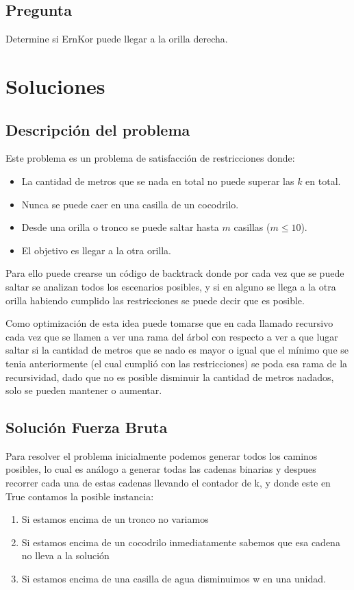\documentclass{article}
\begin{document}
\subsection{Pregunta}
Determine si ErnKor puede llegar a la orilla derecha.

\pagebreak%

\section{Soluciones}

\subsection{Descripción del problema}

Este problema es un problema de satisfacción de restricciones donde:
\begin{itemize}
    \item La cantidad de metros que se nada en total no puede superar las $k$ en total.
    \item Nunca se puede caer en una casilla de un cocodrilo.
    \item Desde una orilla o tronco se puede saltar hasta $m$ casillas ($m \leq 10$).
    \item El objetivo es llegar a la otra orilla.
\end{itemize}

Para ello puede crearse un código de backtrack donde por cada vez que se puede saltar se analizan todos los escenarios posibles, y si en alguno se llega a la otra orilla habiendo cumplido las restricciones se puede decir que es posible.

Como optimización de esta idea puede tomarse que en cada llamado recursivo cada vez que se llamen a ver una rama del árbol con respecto a ver a que lugar saltar si la cantidad de metros que se nado es mayor o igual que el mínimo que se tenia anteriormente (el cual cumplió con las restricciones) se poda esa rama de la recursividad, dado que no es posible disminuir la cantidad de metros nadados, solo se pueden mantener o aumentar.

\subsection{Solución Fuerza Bruta}
Para resolver el problema inicialmente podemos generar todos los caminos posibles, lo cual es análogo a generar todas las cadenas binarias
y despues recorrer cada una de estas cadenas llevando el contador de k, y donde este en True contamos la posible instancia:
\begin{enumerate}
    \item Si estamos encima de un tronco no variamos 
    \item Si estamos encima de un cocodrilo inmediatamente sabemos que esa cadena no lleva a la solución
    \item Si estamos encima de una casilla de agua disminuimos w en una unidad.
\end{enumerate}
\end{document}
